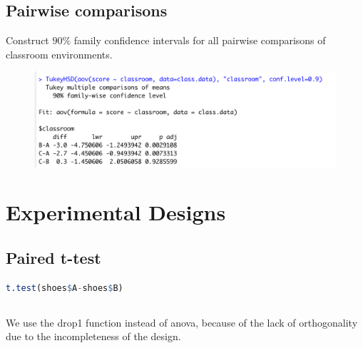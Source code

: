 \documentclass[11pt,a4paper]{article}
\begin{document}
\subsection{Pairwise comparisons}
Construct $90\%$ family confidence intervals for all pairwise comparisons of classroom environments.
\begin{center}\begin{figure}[htbp]
  \centering
  \includegraphics[scale=0.3]{aov}
  \caption{}
  \label{}
\end{figure}\end{center}



\section{ Experimental Designs}
\subsection{ Paired t-test}
\begin{lstlisting}[language=R]
t.test(shoes$A-shoes$B)
\end{lstlisting}

\subsection{}
We use the drop1 function instead of anova, because of the lack of orthogonality due to the incompleteness of the design.
\end{document}

